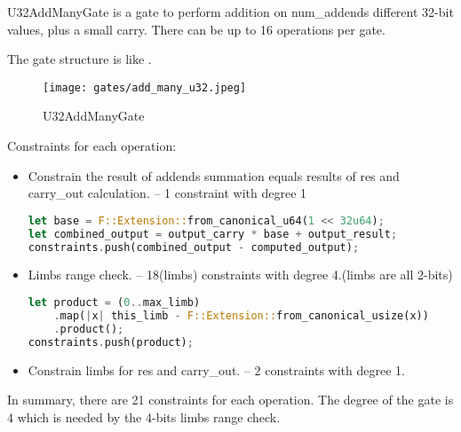 
\hspace*{\fill}

\indent U32AddManyGate is a gate to perform addition on num\_addends different 32-bit values, plus a small carry. 
There can be up to 16 operations per gate.

The gate structure is like .

\begin{figure}[!ht]
    \centering
    \texttt{[image: gates/add\_many\_u32.jpeg]}
    \caption{U32AddManyGate}
    \label{fig:add-many-u32}
\end{figure}

Constraints for each operation:
\begin{itemize}
    \item Constrain the result of addends summation equals results of res and carry\_out calculation. -- 1 constraint with degree 1
    \begin{lstlisting}[language=rust]
let base = F::Extension::from_canonical_u64(1 << 32u64);
let combined_output = output_carry * base + output_result;
constraints.push(combined_output - computed_output);
    \end{lstlisting}
    \item Limbs range check. -- 18(limbs) constraints with degree 4.(limbs are all 2-bits)
    \begin{lstlisting}[language=rust]
let product = (0..max_limb)
    .map(|x| this_limb - F::Extension::from_canonical_usize(x))
    .product();
constraints.push(product);
    \end{lstlisting}
    \item Constrain limbs for res and carry\_out. -- 2 constraints with degree 1.
\end{itemize}

In summary, there are 21 constraints for each operation. The degree of the gate is 4 which is needed by the 4-bits limbs range check.
